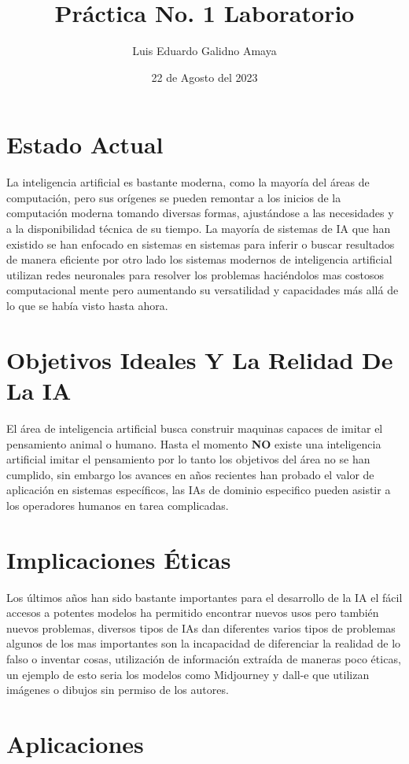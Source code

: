 \documentclass[11pt]{article}
\author{Luis Eduardo Galidno Amaya}
\date{22 de Agosto del 2023}
\title{Práctica No. 1 Laboratorio}
\begin{document}

\section{Estado Actual}
\label{sec:orgbdcfa0d}
La inteligencia artificial es bastante moderna, como la mayoría del áreas de 
computación, pero sus orígenes se pueden remontar a los inicios de la 
computación moderna tomando diversas formas, ajustándose a las necesidades y a 
la disponibilidad técnica de su tiempo. La mayoría de sistemas de IA que han 
existido se han enfocado en sistemas en sistemas para inferir o buscar 
resultados de manera eficiente por otro lado los sistemas modernos de 
inteligencia artificial utilizan redes neuronales para resolver los problemas 
haciéndolos mas costosos computacional mente pero aumentando su versatilidad 
y capacidades más allá de lo que se había visto hasta ahora.


\section{Objetivos Ideales Y La Relidad De La IA}
\label{sec:orgb378cc1}
El área de inteligencia artificial busca construir maquinas capaces de imitar 
el pensamiento animal o humano. Hasta el momento \textbf{NO} existe una inteligencia
artificial imitar el pensamiento por lo tanto los objetivos del área no se han 
cumplido, sin embargo los avances en años recientes han probado el valor de 
aplicación en sistemas específicos, las IAs de dominio especifico pueden
asistir a los operadores humanos en tarea complicadas.


\section{Implicaciones Éticas}
\label{sec:org89df24a}
Los últimos años han sido bastante importantes para el desarrollo de la IA el
fácil accesos a potentes modelos ha permitido encontrar nuevos usos pero 
también nuevos problemas, diversos tipos de IAs dan diferentes varios tipos de 
problemas algunos de los mas importantes son la incapacidad de diferenciar 
la realidad de lo falso o inventar cosas, utilización de información extraída de 
maneras poco éticas, un ejemplo de esto seria los modelos como Midjourney y 
dall-e que utilizan imágenes o dibujos sin permiso de los autores.


\section{Aplicaciones}
\label{sec:orgf856581}
\end{document}
